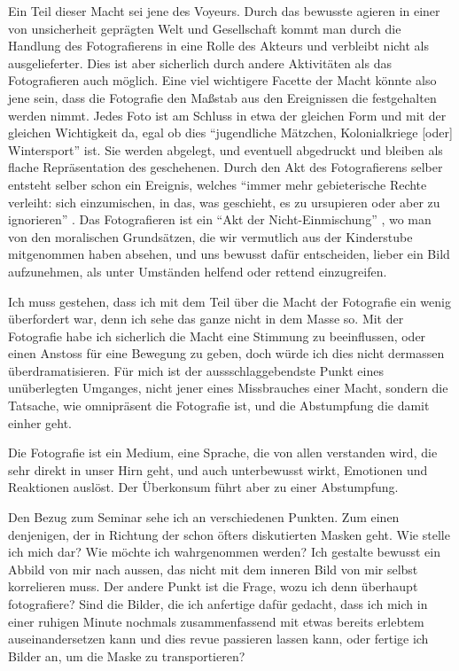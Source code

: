 \documentclass[a4paper,ngerman,11pt]{scrartcl}
\begin{document}
Ein Teil dieser Macht sei jene des Voyeurs. Durch das bewusste agieren in
einer von unsicherheit geprägten Welt und Gesellschaft \cite{Sontag2010} kommt
man durch die Handlung des Fotografierens in eine Rolle des Akteurs und
verbleibt nicht als ausgelieferter. Dies ist aber sicherlich durch andere
Aktivitäten als das Fotografieren auch möglich. Eine viel wichtigere Facette
der Macht könnte also jene sein, dass die Fotografie den Maßstab aus den
Ereignissen die festgehalten werden nimmt. Jedes Foto ist am Schluss in etwa
der gleichen Form und mit der gleichen Wichtigkeit da, egal ob dies
"`jugendliche Mätzchen, Kolonialkriege [oder] Wintersport"' \cite{Sontag2010}
ist. Sie werden abgelegt, und eventuell abgedruckt und bleiben als flache
Repräsentation des geschehenen. Durch den Akt des Fotografierens selber
entsteht selber schon ein Ereignis, welches "`immer mehr gebieterische Rechte
verleiht: sich einzumischen, in das, was geschieht, es zu ursupieren oder aber
zu ignorieren"' \cite{Sontag2010}. Das Fotografieren ist ein "`Akt der
Nicht-Einmischung"' \cite{Sontag2010}, wo man von den moralischen Grundsätzen,
die wir vermutlich aus der Kinderstube mitgenommen haben absehen, und uns
bewusst dafür entscheiden, lieber ein Bild aufzunehmen, als unter Umständen
helfend oder rettend einzugreifen.

Ich muss gestehen, dass ich mit dem Teil über die Macht der Fotografie ein
wenig überfordert war, denn ich sehe das ganze nicht in dem Masse so. Mit der
Fotografie habe ich sicherlich die Macht eine Stimmung zu beeinflussen, oder
einen Anstoss für eine Bewegung zu geben, doch würde ich dies nicht dermassen
überdramatisieren. Für mich ist der aussschlaggebendste Punkt eines
unüberlegten Umganges, nicht jener eines Missbrauches einer Macht, sondern die
Tatsache, wie omnipräsent die Fotografie ist, und die Abstumpfung die damit
einher geht.

Die Fotografie ist ein Medium, eine Sprache, die von allen verstanden wird,
die sehr direkt in unser Hirn geht, und auch unterbewusst wirkt, Emotionen und
Reaktionen auslöst. Der Überkonsum führt aber zu einer Abstumpfung.

Den Bezug zum Seminar sehe ich an verschiedenen Punkten. Zum einen denjenigen,
der in Richtung der schon öfters diskutierten Masken geht. Wie stelle ich mich
dar? Wie möchte ich wahrgenommen werden? Ich gestalte bewusst ein Abbild von
mir nach aussen, das nicht mit dem inneren Bild von mir selbst korrelieren
muss. Der andere Punkt ist die Frage, wozu ich denn überhaupt fotografiere?
Sind die Bilder, die ich anfertige dafür gedacht, dass ich mich in einer
ruhigen Minute nochmals zusammenfassend mit etwas bereits erlebtem
auseinandersetzen kann und dies revue passieren lassen kann, oder fertige ich
Bilder an, um die Maske zu transportieren?



\end{document}
